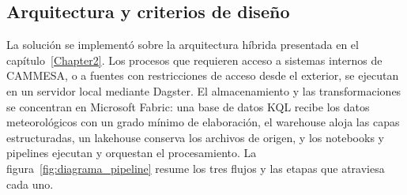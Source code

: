 \subsection{Arquitectura y criterios de diseño}
\label{subsec:criterios_pipeline}

La solución se implementó sobre la arquitectura híbrida presentada en el capítulo~\ref{Chapter2}. Los procesos que requieren acceso a sistemas internos de CAMMESA, o a fuentes con restricciones de acceso desde el exterior, se ejecutan en un servidor local mediante Dagster. El almacenamiento y las transformaciones se concentran en Microsoft Fabric: una base de datos KQL recibe los datos meteorológicos con un grado mínimo de elaboración, el warehouse aloja las capas estructuradas, un lakehouse conserva los archivos de origen, y los notebooks y pipelines ejecutan y orquestan el procesamiento. La figura~\ref{fig:diagrama_pipeline} resume los tres flujos y las etapas que atraviesa cada uno.

